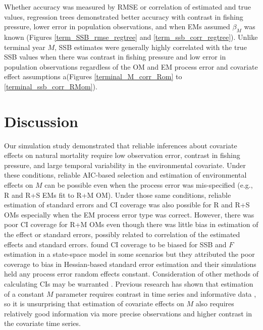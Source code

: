 \documentclass[
  12pt,
]{article}
\begin{document}
Whether accuracy was measured by RMSE or correlation of estimated and
true values, regression trees demonstrated better accuracy with contrast
in fishing pressure, lower error in population observations, and when
EMs assumed \(\beta_M\) was known (Figures \ref{term_SSB_rmse_regtree}
and \ref{term_ssb_corr_regtree}). Unlike terminal year \(M\), SSB
estimates were generally highly correlated with the true SSB values when
there was contrast in fishing pressure and low error in population
observations regardless of the OM and EM process error and covariate
effect assumptions a(Figures \ref{terminal_M_corr_Rom} to
\ref{terminal_ssb_corr_RMom}).

\section*{Discussion}\label{discussion}

Our simulation study demonstrated that reliable inferences about
covariate effects on natural mortality require low observation error,
contrast in fishing pressure, and large temporal variability in the
environmental covariate. Under these conditions, reliable AIC-based
selection and estimation of environmental effects on \(M\) can be
possible even when the process error was mis-specified (e.g., R and R+S
EMs fit to R+M OM). Under those same conditions, reliable estimation of
standard errors and CI coverage was also possible for R and R+S OMs
especially when the EM process error type was correct. However, there
was poor CI coverage for R+M OMs even though there was little bias in
estimation of the effect or standard errors, possibly related to
correlation of the estimated effects and standard errors.
\citet{cadiganetal24} found CI coverage to be biased for SSB and \(F\)
estimation in a state-space model in some scenarios but they attributed
the poor coverage to bias in Hessian-based standard error estimation and
their simulations held any process error random effects constant.
Consideration of other methods of calculating CIs may be warranted
\citep[e.g.,][]{boykoomeara24}. Previous research has shown that
estimation of a constant \(M\) parameter requires contrast in time
series and informative data \citep{leeetal11}, so it is unsurprising
that estimation of covariate effects on \(M\) also requires relatively
good information via more precise observations and higher contrast in
the covariate time series.
\end{document}

